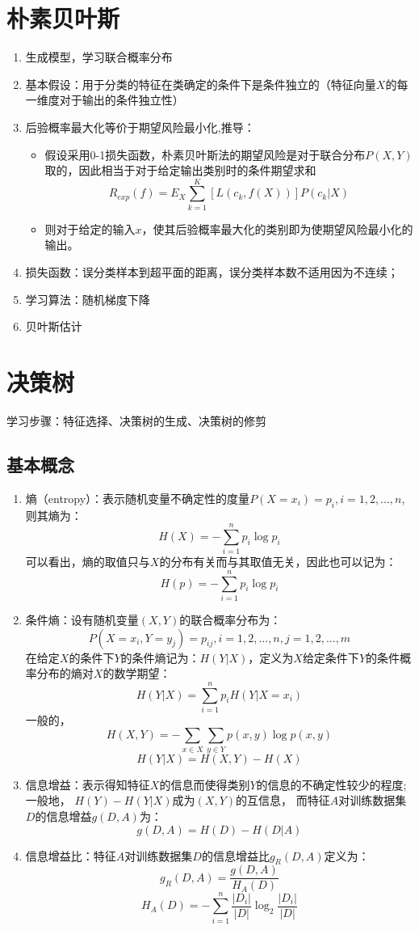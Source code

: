 \documentclass[UTF8]{article}%
\begin{document}
	\section{朴素贝叶斯}
	\begin{enumerate}
		\item 生成模型，学习联合概率分布
		\item 基本假设：用于分类的特征在类确定的条件下是条件独立的（特征向量$X$的每一维度对于输出的条件独立性）
		\item 后验概率最大化等价于期望风险最小化,推导：
		\begin{itemize}
			\item 假设采用0-1损失函数，朴素贝叶斯法的期望风险是对于联合分布$P(X,Y)$取的，因此相当于对于给定输出类别时的条件期望求和$$R_{exp}(f)=E_X\sum\limits_{k=1}^K[L(c_k,f(X))]P(c_k|X)$$
			\item 则对于给定的输入$x$，使其后验概率最大化的类别即为使期望风险最小化的输出。
		\end{itemize}
		\item 损失函数：误分类样本到超平面的距离，误分类样本数不适用因为不连续；
		\item 学习算法：随机梯度下降
		\item 贝叶斯估计
		
	\end{enumerate}
	
	\newpage
	\section{决策树}
	学习步骤：特征选择、决策树的生成、决策树的修剪
	\subsection{基本概念}
	\begin{enumerate}
		\item 熵（entropy）：表示随机变量不确定性的度量$P(X=x_i)=p_i, i=1,2,...,n$,则其熵为：$$H(X)=-\sum\limits_{i=1}^n p_i\log p_i$$
		可以看出，熵的取值只与$X$的分布有关而与其取值无关，因此也可以记为：$$H(p)=-\sum\limits_{i=1}^n p_i\log p_i$$
		\item 条件熵：设有随机变量$(X,Y)$的联合概率分布为：$$P(X=x_i,Y=y_j)=p_{ij}, i=1,2,...,n, j=1,2,...,m$$
		在给定$X$的条件下$Y$的条件熵记为：$H(Y|X)$，定义为$X$给定条件下$Y$的条件概率分布的熵对$X$的数学期望：
		$$H(Y|X)=\sum\limits_{i=1}^n p_iH(Y|X=x_i)$$
		一般的，$$H(X,Y)=-\sum\limits_{x\in X} \sum\limits_{y \in Y } p(x,y)\log p(x,y)$$
		$$H(Y|X)=H(X,Y)-H(X) $$
		\item 信息增益：表示得知特征$X$的信息而使得类别$Y$的信息的不确定性较少的程度;一般地，
		$H(Y)-H(Y|X)$成为$(X,Y)$的互信息，	而特征$A$对训练数据集$D$的信息增益$g(D,A)$为：$$g(D,A)=H(D)-H(D|A)$$
		\item 信息增益比：特征$A$对训练数据集$D$的信息增益比$g_R(D,A)$定义为：
		$$g_R(D,A)=\frac{g(D,A)}{H_A(D)}$$
		$${H_A(D)}=-\sum_{i=1}^{n}\frac{|D_i|}{|D|}\log_2\frac{|D_i|}{|D|}$$
	\end{enumerate}
	
\end{document}
